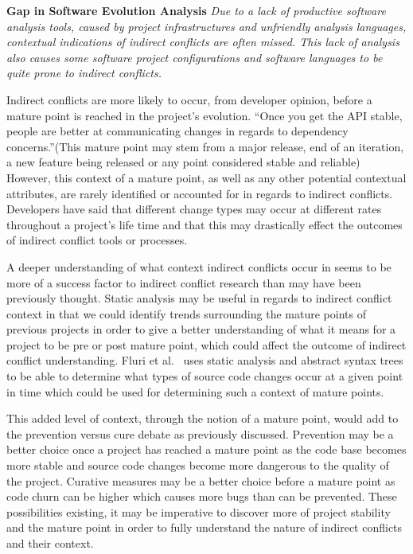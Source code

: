 \documentclass[conference]{IEEEtran}
\begin{document}
\textbf{Gap in Software Evolution Analysis} \textit{Due to a lack of productive software analysis tools, caused by project infrastructures
and unfriendly analysis languages, contextual indications of indirect conflicts are often missed. This lack of analysis also causes
some software project configurations and software languages to be quite prone to indirect conflicts.}

Indirect conflicts are more likely to occur,
from developer opinion, before a mature point is reached in the project's evolution. ``Once you get the API stable, people are 
better at communicating changes in regards to dependency concerns.''(This mature point may stem from a major release,
end of an iteration, a new feature being released or any point considered stable and reliable) However, this context of a 
mature point, as well as any other
potential contextual attributes, are rarely identified or accounted for in regards to indirect conflicts. Developers have said
that different change types may occur at different rates throughout a project's life time and that this
may drastically effect the outcomes of indirect conflict tools or processes.

A deeper understanding of what context indirect conflicts occur in seems to be more of a success factor to indirect conflict
research than may have been previously thought. Static analysis may be useful in regards to indirect conflict context in that we
could identify trends surrounding the mature points of previous projects in order to give a better understanding of what it
means for a project to be pre or post mature point, which could affect the outcome of indirect conflict understanding.
Fluri et al.~\cite{Fluri:2007:CDT} uses static analysis and abstract syntax trees to be able to determine what types of source code
changes occur at a given point in time which could be used for determining such a context of mature points.

This added level of context, through the notion of a mature point, 
would add to the prevention versus cure debate as previously discussed. Prevention may be a better
choice once a project has reached a mature point as the code base becomes more stable and source code changes become more dangerous
to the quality of the project. Curative measures may be a better choice before a mature point as code churn can be higher which
causes more bugs than can be prevented. These possibilities existing, it may be imperative to discover more of project stability
and the mature point in order to fully understand the nature of indirect conflicts and their context.
\end{document}
